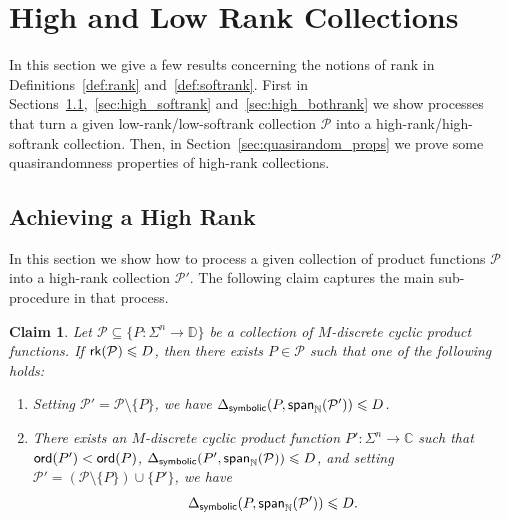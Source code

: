 \documentclass[10pt,a4paper]{amsart}
\newtheorem{claim}[thm]{Claim}
\newcommand\spn{{\sf span}_{\mathbb{N}}}
\renewcommand\leq{\leqslant}
\begin{document}
    \section{High and Low Rank Collections}
    In this section we give a few results concerning the notions of rank in Definitions~\ref{def:rank} and~\ref{def:softrank}. First in Sections~\ref{sec:high_rank},~\ref{sec:high_softrank} and~\ref{sec:high_bothrank}   we show processes that turn a given low-rank/low-softrank collection $\mathcal{P}$ into a high-rank/high-softrank collection. Then, in Section~\ref{sec:quasirandom_props} we prove some quasirandomness properties of high-rank collections.
    \subsection{Achieving a High Rank}\label{sec:high_rank}
    In this section we show how to process a given collection of product functions $\mathcal{P}$ into a high-rank collection $\mathcal{P}'$. The following claim captures the main sub-procedure in that process. 
    \begin{claim}\label{claim:high_rank_process}
        Let $\mathcal{P}\subseteq \{P\colon\Sigma^n\to\mathbb{D}\}$ be a collection of $M$-discrete cyclic product functions. If ${\sf rk}(\mathcal{P})\leq D$, then there exists $P\in \mathcal{P}$ such that one of the following holds:
        \begin{enumerate}
            \item Setting $\mathcal{P}'=\mathcal{P}\setminus\{P\}$, we have $\Delta_{{\sf symbolic}}(P,\spn(\mathcal{P}'))\leq D$.
            \item There exists an $M$-discrete cyclic product function $P'\colon \Sigma^n\to\mathbb{C}$ such that
            ${\sf ord}(P')<{\sf ord}(P)$, $\Delta_{{\sf symbolic}}(P',\spn(\mathcal{P}))\leq D$, and setting $\mathcal{P}'=(\mathcal{P}\setminus\{P\})\cup\{P'\}$, we have 
            \[
            \Delta_{{\sf symbolic}}(P,\spn(\mathcal{P}'))\leq D.
            \]
        \end{enumerate}
    \end{claim}
\end{document}
